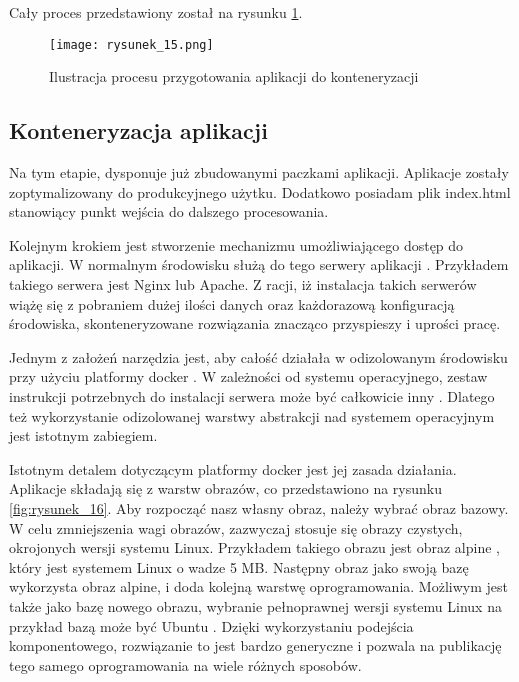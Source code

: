 Cały proces przedstawiony został na rysunku \ref{fig:rysunek_15}.

\begin{figure}[htbp]
    \centering
    \texttt{[image: rysunek\_15.png]}
    \caption{Ilustracja procesu przygotowania aplikacji do konteneryzacji}
    \label{fig:rysunek_15}
\end{figure}

\subsection{Konteneryzacja aplikacji}

Na tym etapie, dysponuje już zbudowanymi paczkami aplikacji. Aplikacje zostały zoptymalizowany do produkcyjnego użytku. Dodatkowo posiadam plik index.html stanowiący punkt wejścia do dalszego procesowania.

Kolejnym krokiem jest stworzenie mechanizmu umożliwiającego dostęp do aplikacji. W normalnym środowisku służą do tego serwery aplikacji \cite{web-server}. Przykładem takiego serwera jest Nginx lub Apache.
Z racji, iż instalacja takich serwerów wiążę się z pobraniem dużej ilości danych oraz każdorazową konfiguracją środowiska, skonteneryzowane rozwiązania znacząco przyspieszy i uprości pracę.

Jednym z założeń narzędzia jest, aby całość działała w odizolowanym środowisku przy użyciu platformy docker \cite{docker}. W zależności od systemu operacyjnego, zestaw instrukcji potrzebnych do instalacji serwera może być całkowicie inny \cite{nginx-windows}\cite{nginx-linux}.
Dlatego też wykorzystanie odizolowanej warstwy abstrakcji nad systemem operacyjnym jest istotnym zabiegiem.

Istotnym detalem dotyczącym platformy docker jest jej zasada działania. Aplikacje składają się z warstw obrazów, co przedstawiono na rysunku \ref{fig:rysunek_16}.
Aby rozpocząć nasz własny obraz, należy wybrać obraz bazowy. W celu zmniejszenia wagi obrazów, zazwyczaj stosuje się obrazy czystych, okrojonych wersji systemu Linux.
Przykładem takiego obrazu jest obraz alpine \cite{docker-alpine}, który jest systemem Linux o wadze 5 MB. Następny obraz jako swoją bazę wykorzysta obraz alpine, i doda kolejną warstwę oprogramowania.
Możliwym jest także jako bazę nowego obrazu, wybranie pełnoprawnej wersji systemu Linux na przykład bazą może być Ubuntu \cite{ubuntu}.
Dzięki wykorzystaniu podejścia komponentowego, rozwiązanie to jest bardzo generyczne i pozwala na publikację tego samego oprogramowania na wiele różnych sposobów.

